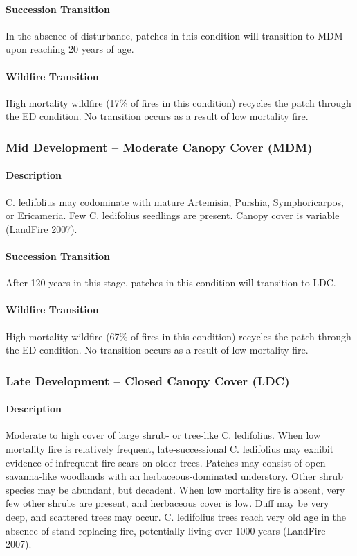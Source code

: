 \paragraph{Succession Transition} In the absence of disturbance, patches in this condition will transition to MDM upon reaching 20 years of age. 

\paragraph{Wildfire Transition} High mortality wildfire (17\% of fires in this condition) recycles the patch through the ED condition. No transition occurs as a result of low mortality fire.

\noindent\hrulefill


\subsubsection{Mid Development – Moderate Canopy Cover (MDM)}

\paragraph{Description} C. ledifolius may codominate with mature Artemisia, Purshia, Symphoricarpos, or Ericameria. Few C. ledifolius seedlings are present. Canopy cover is variable (LandFire 2007).

\paragraph{Succession Transition} After 120 years in this stage, patches in this condition will transition to LDC.

\paragraph{Wildfire Transition} High mortality wildfire (67\% of fires in this condition) recycles the patch through the ED condition. No transition occurs as a result of low mortality fire.

\noindent\hrulefill


\subsubsection{Late Development – Closed Canopy Cover (LDC)}

\paragraph{Description} Moderate to high cover of large shrub- or tree-like C. ledifolius. When low mortality fire is relatively frequent, late-successional C. ledifolius may exhibit evidence of infrequent fire scars on older trees. Patches may consist of open savanna-like woodlands with an herbaceous-dominated understory. Other shrub species may be abundant, but decadent. When low mortality fire is absent, very few other shrubs are present, and herbaceous cover is low. Duff may be very deep, and scattered trees may occur. C. ledifolius trees reach very old age in the absence of stand-replacing fire, potentially living over 1000 years (LandFire 2007).


